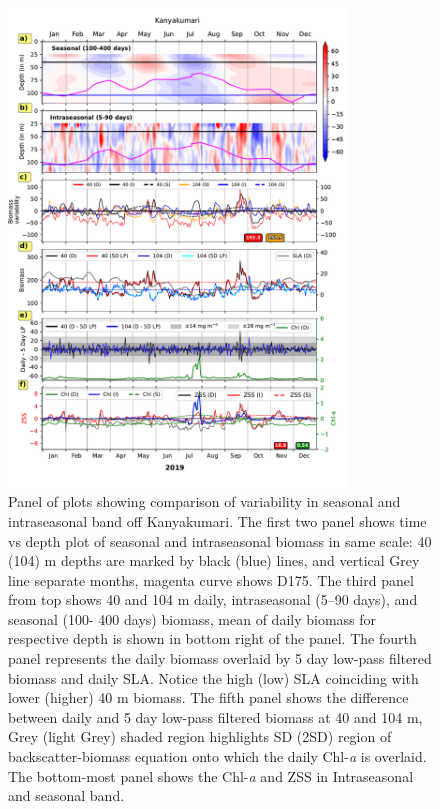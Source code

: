 \documentclass[12pt,a4paper]{article}
\begin{document}
\begin{figure}[htbp]
		\centering
		\includegraphics[width=0.8\textwidth]{./figures/biomass_intra_2019_kanyakumari.pdf} 
		\caption{Panel of plots showing comparison of variability in seasonal and intraseasonal band off Kanyakumari. The first two panel shows time vs depth plot of seasonal and intraseasonal biomass in same scale: 40 (104) m depths are marked by black (blue) lines, and vertical Grey line separate months, magenta curve shows D175. The third panel from top shows 40 and 104 m daily, intraseasonal (5--90 days), and seasonal (100- 400 days) biomass, mean of daily biomass for respective depth is shown in bottom right of the panel. The fourth panel represents the daily biomass overlaid by 5 day low-pass filtered biomass and daily SLA. Notice the high (low) SLA coinciding with lower (higher) 40 m biomass. The fifth panel shows the difference between daily and 5 day low-pass filtered biomass at 40 and 104 m, Grey (light Grey) shaded region highlights SD (2SD) region of backscatter-biomass equation onto which the daily Chl-\textit{a} is overlaid. The bottom-most panel shows the Chl-\textit{a} and ZSS in Intraseasonal and seasonal band.}		
		\label{fig:biomass_intra_2019_kanyakumari}

\end{figure}
\end{document}

